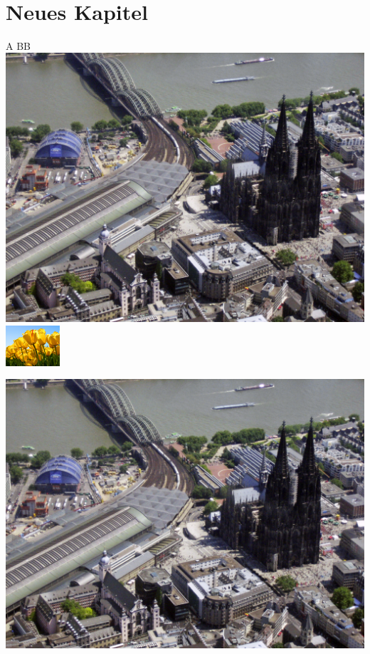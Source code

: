 \documentclass[
    fontsize=11pt,%
    paper=a4,%
    headings=small,
    parskip=half,
    listof=totoc,
    bibliography=totoc,
    cleardoublepage=empty,
    pagesize
]{scrbook}
\theoremstyle{break}
\theoremstyle{plain}
\begin{document}
\cite{Mittelbach.2004}

\hspace*{\fill}
\\

\chapter{Neues Kapitel}
\blindtext

A B\hfill B\\
\newlength{\myheight}
\includegraphics[height=\myheight]{Abbildungen/Koeln_RdFlug_1}
\includegraphics[width=2cm]{Abbildungen/Tulips}

\addtolength{\myheight}{3cm}
\includegraphics[height=\myheight]{Abbildungen/Koeln_RdFlug_1}

\nocite{*}
\printbibliography[nottype=online]
\printbibliography[type=online]
\end{document}
